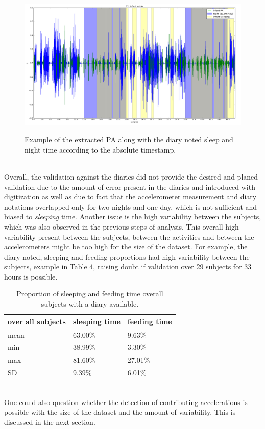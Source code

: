 \documentclass{article}
\begin{document}
{ \begin{figure}[h!]
\includegraphics[width=15cm, height=7cm]{12PA.png}
\caption{Example of the extracted PA along with the diary noted sleep and night time according to the absolute timestamp.}
\end{figure}
\\Overall, the validation against the diaries did not provide the desired and planed validation due to the amount of error present in the diaries and introduced with digitization as well as due to fact that the accelerometer measurement and diary notations overlapped only for two nights and one day, which is not sufficient and biased to \textit{sleeping} time. Another issue is the high variability between the subjects, which was also observed in the previous steps of analysis. This overall high variability present between the subjects, between the activities and between the accelerometers might be too high for the size of the dataset. For example, the diary noted, sleeping and feeding proportions had high variability between the subjects, example in Table 4, raising doubt if validation over 29 subjects for 33 hours is possible.
\begin{table}[h]
\centering
\begin{tabular}{|l|l|l|}
\hline
over all subjects & sleeping time & feeding time \\ \hline
mean   & 63.00\%  & 9.63\%  \\ \hline
min   & 38.99\%  & 3.30\%  \\ \hline
max   & 81.60\%  & 27.01\% \\ \hline
SD   & 9.39\%  & 6.01\%  \\ \hline
\end{tabular}
\caption{Proportion of sleeping and feeding time overall subjects with a diary available.}
\end{table}
\\One could also question whether the detection of contributing accelerations is possible with the size of the dataset and the amount of variability. This is discussed in the next section.
}
\end{document}

